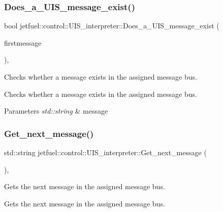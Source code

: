 \subsubsection{\texorpdfstring{Does\+\_\+a\+\_\+\+U\+I\+S\+\_\+message\+\_\+exist()}{Does\_a\_UIS\_message\_exist()}}
{\footnotesize\ttfamily bool jetfuel\+::control\+::\+U\+I\+S\+\_\+interpreter\+::\+Does\+\_\+a\+\_\+\+U\+I\+S\+\_\+message\+\_\+exist (\begin{DoxyParamCaption}\item[{std\+::string $\ast$}]{firstmessage }\end{DoxyParamCaption})\hspace{0.3cm}{\ttfamily [inline]}, {\ttfamily [protected]}}



Checks whether a message exists in the assigned message bus. 

Checks whether a message exists in the assigned message bus.


\begin{DoxyParams}{Parameters}
{\em std\+::string} & message \\
\hline
\end{DoxyParams}
\mbox{\label{classjetfuel_1_1control_1_1UIS__interpreter_ac385462d25e7be509fad46874dcb40e0}} 
\subsubsection{\texorpdfstring{Get\+\_\+next\+\_\+message()}{Get\_next\_message()}}
{\footnotesize\ttfamily std\+::string jetfuel\+::control\+::\+U\+I\+S\+\_\+interpreter\+::\+Get\+\_\+next\+\_\+message (\begin{DoxyParamCaption}{ }\end{DoxyParamCaption})\hspace{0.3cm}{\ttfamily [inline]}, {\ttfamily [protected]}}



Gets the next message in the assigned message bus. 

Gets the next message in the assigned message bus. \mbox{\label{classjetfuel_1_1control_1_1UIS__interpreter_ab298d59fded69955c059fb33e4ddb3ee}} 

